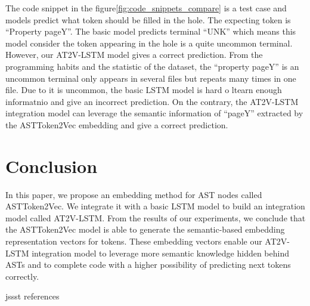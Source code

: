 \documentclass[E]{compsoft}
\begin{document}
The code snippet in the figure\ref{fig:code_snippets_compare} is a test case and models predict what token should be filled in the hole.
The expecting token is ``Property pageY''.
The basic model predicts terminal ``UNK'' which means this model consider the token appearing in the hole is a quite uncommon terminal.
However, our AT2V-LSTM model gives a correct prediction.
From the programming habits and the statistic of the dataset, the ``property pageY'' is an uncommon terminal only appears in several files but repeats many times in one file. 
Due to it is uncommon, the basic LSTM model is hard o ltearn enough informatnio and give an incorrect prediction.
On the contrary, the AT2V-LSTM integration model can leverage the semantic information of ``pageY'' extracted by the ASTToken2Vec embedding and give a correct prediction.



\section{Conclusion}
In this paper, we propose an embedding method for AST nodes called ASTToken2Vec. 
We integrate it with a basic LSTM model to build an integration model called AT2V-LSTM.
From the results of our experiments, we conclude that the ASTToken2Vec model is able to generate the semantic-based embedding representation vectors for tokens.
These embedding vectors enable our AT2V-LSTM integration model to leverage more semantic knowledge hidden behind ASTs and to complete code with a higher possibility of predicting next tokens correctly. 



 {jssst}
 {references}
\end{document}
